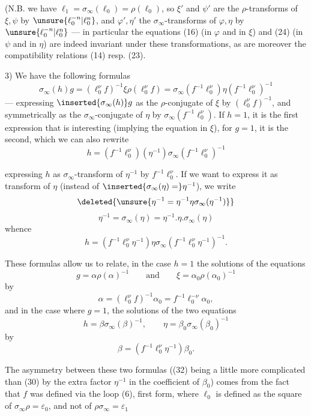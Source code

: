 (N.B. we have $\ell_1=\sigma_\infty(\ell_0)=\rho(\ell_0)$, so $\xi'$ and $\psi'$ are the $\rho$-transforms of $\xi,\psi$ by $\unsure{\ell_0^{-n}|\ell_0^n}$, and $\varphi',\eta'$ the $\sigma_\infty$-transforms of $\varphi,\eta$ by $\unsure{\ell_0^{-n}|\ell_0^n}$ --- in particular the equations (16) (in $\varphi$ and in $\xi$) and (24) (in $\psi$ and in $\eta$) are indeed invariant under these transformations, as are moreover the compatibility relations (14) resp. (23).

3) We have the following formulas 
\[
 \sigma_\infty(h)g
 = (\ell_0^\nu f)^{-1}\xi\rho(\ell_0^\nu f)
 = \sigma_\infty(f^{-1}\ell_0^\nu)\eta(f^{-1}\ell_0^\nu)^{-1}
 \tag{27}
\]
 --- expressing $\inserted{\sigma_\infty(h)}g$ as the $\rho$-conjugate of $\xi$ by $(\ell_0^\nu f)^{-1}$, and symmetrically  as the $\sigma_\infty$-conjugate of $\eta$ by $\sigma_\infty(f^{-1}\ell_0^\nu)$. If $h=1$, it is the first expression that is interesting (implying the equation in $\xi$), for $g=1$, it is the second, which we can also rewrite 
\[
 h=(f^{-1}\ell_0^\nu)(\eta^{-1})\sigma_\infty(f^{-1}\ell_0^\nu)^{-1}
 \tag{28}
\]


expressing $h$ as $\sigma_\infty$-transform of $\eta^{-1}$ by $f^{-1}\ell_0^\nu$. If we want to express it as \inserted{$\sigma_\infty$-}transform of $\eta$ (instead of $\inserted{\sigma_\infty(\eta)=}\eta^{-1}$), we write
\[
 \deleted{\unsure{\eta^{-1}=\eta^{-1}\eta\sigma_\infty(\eta^{-1})}}
\]
\[
 \eta^{-1}=\sigma_\infty(\eta)=\eta^{-1}.\eta.\sigma_\infty(\eta)
\]
whence
\[
 h=(f^{-1}\ell_0^\nu\eta^{-1})\eta\sigma_\infty(f^{-1}\ell_0^\nu\eta^{-1})^{-1}.
 \tag{28bis}
\]

These formulas allow us to relate, in the case $h=1$ the solutions of the  equations
\[
 g=\alpha\rho(\alpha)^{-1}
 \qquad\text{and}\qquad
 \xi=\alpha_0\rho(\alpha_0)^{-1}
 \tag{29}
\]
by
\[
 \alpha=(\ell_0^\nu f)^{-1}\alpha_0=f^{-1}\ell_0^{-\nu}\alpha_0,
 \tag{30}
\]
and in the case where $g=1$, the solutions of the two equations
\[
 h=\beta\sigma_\infty(\beta)^{-1},\qquad
 \eta=\beta_0\sigma_\infty(\beta_0)^{-1}
 \tag{31}
\]
by
\[
 \beta=(f^{-1}\ell_0^\nu\eta^{-1})\beta_0.
 \tag{32}
\]

The asymmetry between these two formulas ((32) being a little more complicated than (30) by the extra factor $\eta^{-1}$ in the coefficient of $\beta_0$) comes from the fact that $f$ was defined via the loop  (6), first form, where $\ell_0$ is defined as the square of $\sigma_\infty\rho=\varepsilon_0$, and not of $\rho\sigma_\infty=\varepsilon_1$
